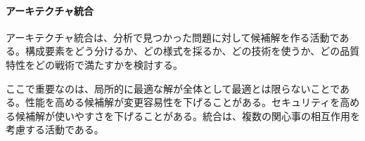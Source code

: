 \paragraph{アーキテクチャ統合}
アーキテクチャ統合は、分析で見つかった問題に対して候補解を作る活動である。構成要素をどう分けるか、どの様式を採るか、どの技術を使うか、どの品質特性をどの戦術で満たすかを検討する。

ここで重要なのは、局所的に最適な解が全体として最適とは限らないことである。性能を高める候補解が変更容易性を下げることがある。セキュリティを高める候補解が使いやすさを下げることがある。統合は、複数の関心事の相互作用を考慮する活動である。
